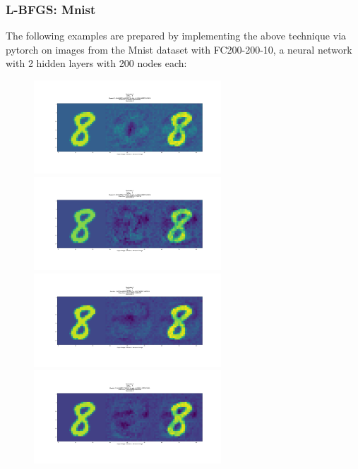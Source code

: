 \documentclass[10pt]{extarticle}
\begin{document}
\subsubsection{L-BFGS: Mnist}
The following examples are prepared by implementing the above technique via pytorch on images from the Mnist dataset with FC200-200-10, a neural network with 2 hidden layers with 200 nodes each:
\begin{figure}[H]
\label{lbfgsa}
\includegraphics[trim=200 185 100 200, clip, width=7cm]{2019-04-10-adverse/mnist_examples/FC200-200-10-2448-O8-A0-attack_summary.png}\includegraphics[trim=200 185 100 200, clip,width=7cm]{2019-04-10-adverse/mnist_examples/FC200-200-10-2448-O8-A1-attack_summary.png}
\includegraphics[trim=200 185 100 200, clip,width=7cm]{2019-04-10-adverse/mnist_examples/FC200-200-10-2448-O8-A2-attack_summary.png}\includegraphics[trim=200 185 100 200, clip,width=7cm]{2019-04-10-adverse/mnist_examples/FC200-200-10-2448-O8-A3-attack_summary.png}

\end{figure}
\end{document}
